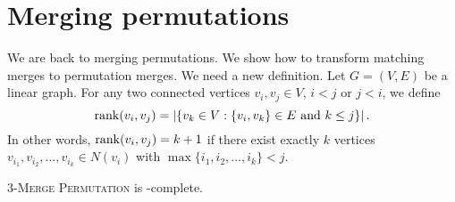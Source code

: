 \section{Merging permutations}
\label{section:Merging permutations}

We are back to merging permutations. 
We show how to transform matching merges to permutation merges.
We need a new definition.
Let $G = (V, E)$ be a linear graph. For any two connected vertices
$v_i, v_j \in V$, $i < j$ or $j < i$,
we define
$$
\operatorname{rank}(v_i, v_j) = \left|\left\{v_k \in V : \{v_i, v_k\} \in E \text{ and } k \leq j\right\}\right|.
$$
In other words, $\operatorname{rank}(v_i, v_j) = k+1$ if there exist exactly $k$ vertices
$v_{i_1}, v_{i_2}, \dots, v_{i_k} \in N(v_i)$
with $\max \{i_1, i_2, \dots, i_k\} < j$.

\begin{proposition}
  \label{proposition:3-merge permutation is NP-complete}
  \textsc{$3$-Merge Permutation} is \NP-complete.
\end{proposition}

